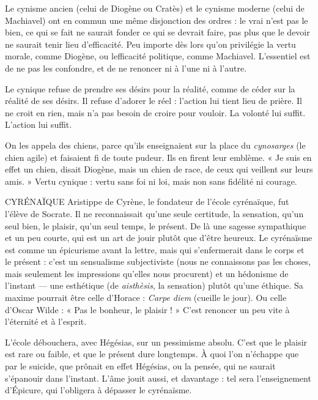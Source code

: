 Le cynisme ancien (celui de Diogène ou Cratès) et le cynisme moderne
(celui de Machiavel) ont en commun une même disjonction des ordres : le vrai
n’est pas le bien, ce qui se fait ne saurait fonder ce qui se devrait faire, pas plus
que le devoir ne saurait tenir lieu d’efficacité. Peu importe dès lors qu’on privilégie
la vertu morale, comme Diogène, ou lefficacité politique, comme
Machiavel. L'essentiel est de ne pas les confondre, et de ne renoncer ni à l’une
ni à l’autre.

Le cynique refuse de prendre ses désirs pour la réalité, comme de céder sur
la réalité de ses désirs. Il refuse d’adorer le réel : l’action lui tient lieu de prière.
Il ne croit en rien, mais n’a pas besoin de croire pour vouloir. La volonté lui
suffit. L'action lui suffit.

On les appela des chiens, parce qu’ils enseignaient sur la place du {\it cynosarges}
(le chien agile) et faisaient fi de toute pudeur. Ils en firent leur emblème. « Je
suis en effet un chien, disait Diogène, mais un chien de race, de ceux qui
veillent sur leurs amis. » Vertu cynique : vertu sans foi ni loi, mais non sans
fidélité ni courage.

CYRÉNAÏQUE Aristippe de Cyrène, le fondateur de l’école cyrénaïque, fut
l'élève de Socrate. Il ne reconnaissait qu’une seule certitude,
la sensation, qu’un seul bien, le plaisir, qu’un seul temps, le présent. De
là une sagesse sympathique et un peu courte, qui est un art de jouir plutôt que
d’être heureux. Le cyrénaïsme est comme un épicurisme avant la lettre, mais
qui s’enfermerait dans le corps et le présent : c’est un sensualisme subjectiviste
(nous ne connaissons pas les choses, mais seulement les impressions qu’elles
nous procurent) et un hédonisme de l’instant — une esthétique (de {\it aisthèsis}, la
sensation) plutôt qu’une éthique. Sa maxime pourrait être celle d’Horace :
{\it Carpe diem} (cueille le jour). Ou celle d’Oscar Wilde : « Pas le bonheur, le
plaisir ! » C’est renoncer un peu vite à l'éternité et à l’esprit.

L'école débouchera, avec Hégésias, sur un pessimisme absolu. C’est que le
plaisir est rare ou faible, et que le présent dure longtemps. À quoi l’on
n'échappe que par le suicide, que prônait en effet Hégésias, ou la pensée, qui
ne saurait s'épanouir dans l'instant. L'âme jouit aussi, et davantage : tel sera
l’enseignement d’Épicure, qui l’obligera à dépasser le cyrénaïsme.

